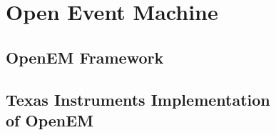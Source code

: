 \chapter{Open Event Machine}
\label{chapter:openem}


\section{OpenEM Framework}
\label{sec:emframework}


\section[Texas Instruments Implementation of OpenEM]{Texas Instruments Implementation\\of OpenEM}
\label{sec:tiopenem}


